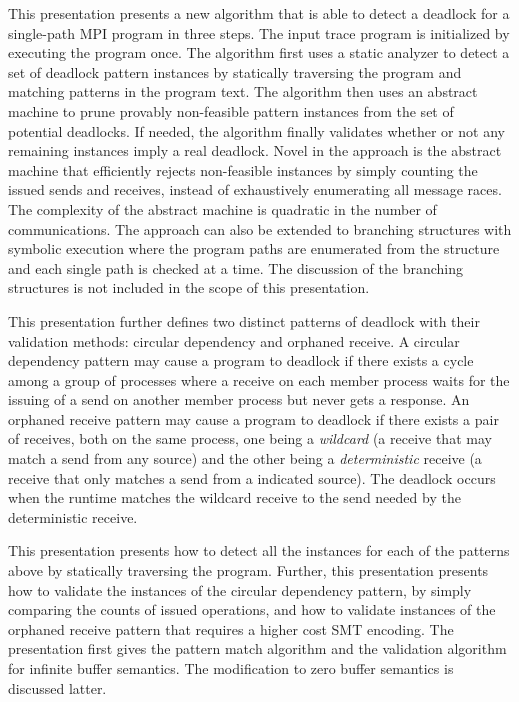 This presentation presents a new algorithm that is able to detect a deadlock for a single-path MPI program in three steps. 
The input trace program is initialized by executing the program once.
The algorithm first uses a static analyzer to detect a set of deadlock pattern instances by statically traversing the program and matching patterns in the program text. The algorithm then uses an abstract machine to prune provably non-feasible pattern instances from the set of potential deadlocks. If needed, the algorithm finally validates whether or not any remaining instances imply a real deadlock. Novel in the approach is the abstract machine that efficiently rejects non-feasible instances by simply counting the issued sends and receives, instead of exhaustively enumerating all message races. The complexity of the abstract machine is quadratic in the number of communications. The approach can also be extended to branching structures with symbolic execution where the program paths are enumerated from the structure and each single path is checked at a time. The discussion of the branching structures is not included in the scope of this presentation.

This presentation further defines two distinct patterns of deadlock with their validation methods: circular dependency and orphaned receive. A circular dependency pattern may cause a program to deadlock if there exists a cycle among a group of processes where a receive on each member process waits for the issuing of a send on another member process but never gets a response. An orphaned receive pattern may cause a program to deadlock if there exists a pair of receives, both on the same process, one being a \emph{wildcard} (a receive that may match a send from any source) and the other being a \emph{deterministic} receive (a receive that only matches a send from a indicated source). The deadlock occurs when the runtime matches the wildcard receive to the send needed by the deterministic receive. 

This presentation presents how to detect all the instances for each of the patterns above by statically traversing the program. Further, this presentation presents how to validate the instances of the circular dependency pattern, by simply comparing the counts of issued operations, and how to validate instances of the orphaned receive pattern that requires a higher cost SMT encoding. The presentation first gives the pattern match algorithm and the validation algorithm for infinite buffer semantics. The modification to zero buffer semantics is discussed latter.  

